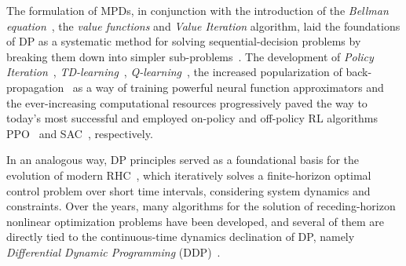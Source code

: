 The formulation of MPDs, in conjunction with the introduction of the \textit{Bellman equation}~\cite{rl:bellman1960dynamic}, the \textit{value functions} and \textit{Value Iteration} algorithm, laid the foundations of DP as a systematic method for solving sequential-decision problems by breaking them down into simpler sub-problems~\cite{rl:bellman1960dynamic}. The development of \textit{Policy Iteration}~\cite{rl:howard1960dynamic}, \textit{TD-learning}~\cite{rl:barto1983neuronlike}, \textit{Q-learning}~\cite{rl:watkins1989learning}, the increased popularization of back-propagation~\cite{rl:rumelhart1986learning} as a way of training powerful neural function approximators and the ever-increasing computational resources progressively paved the way to today's most successful and employed on-policy and off-policy RL algorithms PPO~\cite{rl:schulman2017proximal} and SAC~\cite{rl:haarnoja2018soft}, respectively. 

In an analogous way, DP principles served as a foundational basis for the evolution of modern RHC~\cite{modern_mpc:grandia2023perceptive}, which iteratively solves a finite-horizon optimal control problem over short time intervals, considering system dynamics and constraints. Over the years, many algorithms for the solution of receding-horizon nonlinear optimization problems have been developed, and several of them are directly tied to the continuous-time dynamics declination of DP, namely \textit{Differential Dynamic Programming} (DDP)~\cite{rhc:jacobson1970differential,rhc:todorov2005generalized,rhc:diehl2009efficient,rhc:tassa2012synthesis}.